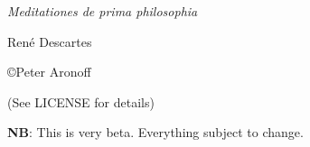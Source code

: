 \begin{titlepage}

\begin{center}

\huge \textit{Meditationes de prima philosophia}

\huge René Descartes 

\vskip2in

\large \copyright Peter Aronoff \the\year

(See LICENSE for details)

\vskip1in

\textbf{NB}: This is very beta. Everything subject to change.

\vskip2in

\newpage

\end{center}

\end{titlepage}
